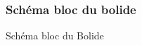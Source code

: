 \begin{figure}[hbtp]
\subsubsection{Schéma bloc du bolide}
\caption{Schéma bloc du Bolide}
\centering
{}
\end{figure}

\vfill
\pagebreak


